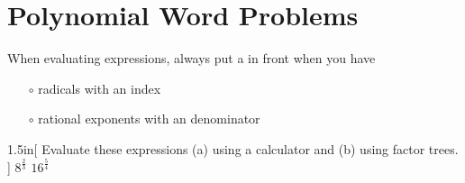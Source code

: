 
\section{Polynomial Word Problems}




\begin{myCenteredBox}[width=5.25in,colback=white,]
    When evaluating expressions, 
    always put a \gap{$\pm$} in front when you have
    \begin{itemize}[nosep]
        \item[$\circ$] radicals with an  index
        \item[$\circ$] rational exponents with an  denominator
    \end{itemize}
\end{myCenteredBox}


\begin{my2Problems}[\large]{1.5in}[
    Evaluate these expressions 
    (a) using a calculator and 
    (b) using factor trees.
    ]
    {
        $ 8^{\frac{2}{3}} $
    }
    {
        $ 16^{\frac{5}{4}} $
    }
\end{my2Problems}

